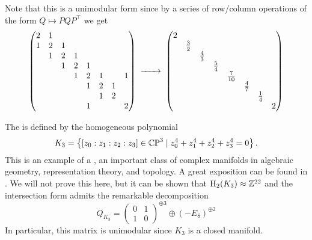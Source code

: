Note that this is a unimodular form since by a series of row/column operations of the form $Q\mapsto PQP^\intercal$ we get
	\[
		\begin{pmatrix}
			2 & 1 &   &   &   &   &   &   \\
			1 & 2 & 1 &   &   &   &   &   \\
			  & 1 & 2 & 1 &   &   &   &   \\
			  &   & 1 & 2 & 1 &   &   &   \\
			  &   &   & 1 & 2 & 1 &   & 1 \\
			  &   &   &   & 1 & 2 & 1 &   \\
			  &   &   &   &   & 1 & 2 &   \\
			  &   &   &   & 1 &   &   & 2 \\
		\end{pmatrix}
		\lkxto
		\begin{pmatrix}
			2 &             &             &             &              &             &             &   \\
			  & \frac{3}{2} &             &             &              &             &             &   \\
			  &             & \frac{4}{3} &             &              &             &             &   \\
			  &             &             & \frac{5}{4} &              &             &             &   \\
			  &             &             &             & \frac{7}{10} &             &             &   \\
			  &             &             &             &              & \frac{4}{7} &             &   \\
			  &             &             &             &              &             & \frac{1}{4} &   \\
			  &             &             &             &              &             &             & 2 \\
		\end{pmatrix}
	\]

\begin{example}\label{example:k3}
	The  is defined by the homogeneous polynomial
	\[
		K_3 = \left\{ [z_0 : z_1 : z_2 : z_3]\in \mathbb{CP}^3 \mid z_0^4 + z_1^4+z_2^4 + z_3^4=0\right\}.
	\]
	This is an example of a , an important class of complex manifolds in algebraic geometry, representation theory, and topology. A great exposition can be found in \cite{huybrechtsK3}. We will not prove this here, but it can be shown that $\operatorname{H}_2(K_3)\approx \mathbb{Z}^{22}$ and the intersection form admits the remarkable decomposition
	\[
		Q_{K_3} =
		\begin{pmatrix}
			0 & 1 \\ 1 & 0
		\end{pmatrix}^{\oplus 3}\oplus
		(-E_8)^{\oplus 2}
	\]
	In particular, this matrix is unimodular since $K_3$ is a closed manifold. 
\end{example}

